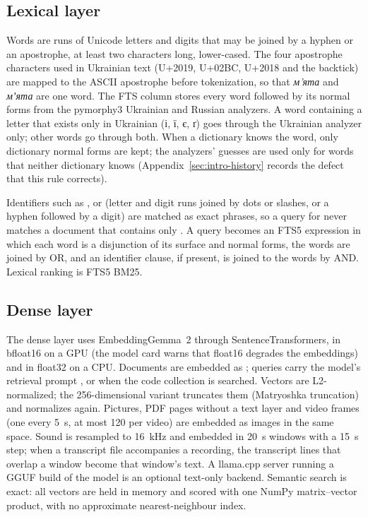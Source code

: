 \subsection{Lexical layer}
Words are runs of Unicode letters and digits that may be joined by a hyphen or an apostrophe, at least two characters long, lower-cased. The four apostrophe characters used in Ukrainian text (U+2019, U+02BC, U+2018 and the backtick) are mapped to the ASCII apostrophe before tokenization, so that \emph{м’ята} and \emph{мʼята} are one word. The FTS  column stores every word followed by its normal forms from the pymorphy3 Ukrainian and Russian analyzers. A word containing a letter that exists only in Ukrainian (і, ї, є, ґ) goes through the Ukrainian analyzer only; other words go through both. When a dictionary knows the word, only dictionary normal forms are kept; the analyzers' guesses are used only for words that neither dictionary knows (Appendix~\ref{sec:intro-history} records the defect that this rule corrects).

Identifiers such as ,  or  (letter and digit runs joined by dots or slashes, or a hyphen followed by a digit) are matched as exact phrases, so a query for  never matches a document that contains only . A query becomes an FTS5 expression in which each word is a disjunction of its surface and normal forms, the words are joined by OR, and an identifier clause, if present, is joined to the words by AND. Lexical ranking is FTS5 BM25.

\subsection{Dense layer}
The dense layer uses EmbeddingGemma~2 through SentenceTransformers, in bfloat16 on a GPU (the model card warns that float16 degrades the embeddings) and in float32 on a CPU. Documents are embedded as ; queries carry the model's retrieval prompt , or  when the code collection is searched. Vectors are L2-normalized; the 256-dimensional variant truncates them (Matryoshka truncation) and normalizes again. Pictures, PDF pages without a text layer and video frames (one every 5~s, at most 120 per video) are embedded as images in the same space. Sound is resampled to 16~kHz and embedded in 20~s windows with a 15~s step; when a transcript file accompanies a recording, the transcript lines that overlap a window become that window's text. A llama.cpp server running a GGUF build of the model is an optional text-only backend. Semantic search is exact: all vectors are held in memory and scored with one NumPy matrix--vector product, with no approximate nearest-neighbour index.

